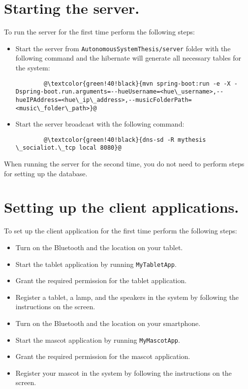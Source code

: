 \section{Starting the server.}
\label{sec:starting-the-server.}
To run the server for the first time perform the following steps:
\begin{itemize}
    \item Start the server from \texttt{AutonomousSystemThesis/server} folder with the following
    command and the hibernate will generate all necessary tables for the system:
    \begin{lstlisting}
        @\textcolor{green!40!black}{mvn spring-boot:run -e -X -Dspring-boot.run.arguments=--hueUsername=<hue\_username>,--hueIPAddress=<hue\_ip\_address>,--musicFolderPath=<music\_folder\_path>}@
    \end{lstlisting}
    \item Start the server broadcast with the following command:
    \begin{lstlisting}
        @\textcolor{green!40!black}{dns-sd -R mythesis \_socialiot.\_tcp local 8080}@
    \end{lstlisting}
\end{itemize}
When running the server for the second time, you do not need to perform steps for setting
up the database.
\section{Setting up the client applications.}
\label{sec:setting-up-the-client-applications.}
To set up the client application for the first time perform the following steps:
\begin{itemize}
    \item Turn on the Bluetooth and the location on your tablet.
    \item Start the tablet application by running \texttt{MyTabletApp}.
    \item Grant the required permission for the tablet application.
    \item Register a tablet, a lamp, and the speakers in the system by following the instructions on the screen.
    \item Turn on the Bluetooth and the location on your smartphone.
    \item Start the mascot application by running \texttt{MyMascotApp}.
    \item Grant the required permission for the mascot application.
    \item Register your mascot in the system by following the instructions on the screen.
\end{itemize}


